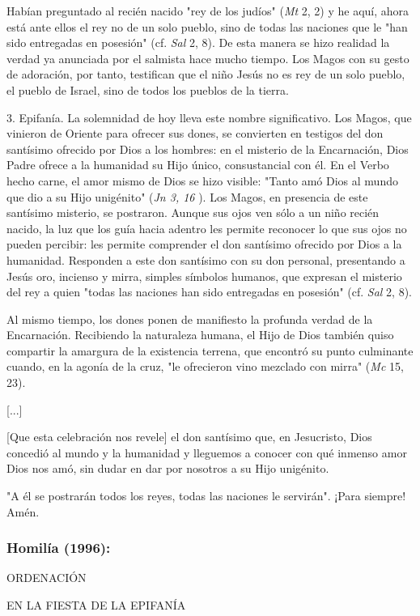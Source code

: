 \begin{body}
Habían preguntado al recién nacido "rey de los judíos" (\emph{Mt} 2, 2) y he aquí, ahora está ante ellos el rey no de un solo pueblo, sino de todas las naciones que le "han sido entregadas en posesión" (cf. \emph{Sal} 2, 8). De esta manera se hizo realidad la verdad ya anunciada por el salmista hace mucho tiempo. Los Magos con su gesto de adoración, por tanto, testifican que el niño Jesús no es rey de un solo pueblo, el pueblo de Israel, sino de todos los pueblos de la tierra.

3. Epifanía. La solemnidad de hoy lleva este nombre significativo. Los Magos, que vinieron de Oriente para ofrecer sus dones, se convierten en testigos del don santísimo ofrecido por Dios a los hombres: en el misterio de la Encarnación, Dios Padre ofrece a la humanidad su Hijo único, consustancial con él. En el Verbo hecho carne, el amor mismo de Dios se hizo visible: "Tanto amó Dios al mundo que dio a su Hijo unigénito" (\emph{Jn 3, 16} ). Los Magos, en presencia de este santísimo misterio, se postraron. Aunque sus ojos ven sólo a un niño recién nacido, la luz que los guía hacia adentro les permite reconocer lo que sus ojos no pueden percibir: les permite comprender el don santísimo ofrecido por Dios a la humanidad. Responden a este don santísimo con su don personal, presentando a Jesús oro, incienso y mirra, simples símbolos humanos, que expresan el misterio del rey a quien "todas las naciones han sido entregadas en posesión" (cf. \emph{Sal} 2, 8).

Al mismo tiempo, los dones ponen de manifiesto la profunda verdad de la Encarnación. Recibiendo la naturaleza humana, el Hijo de Dios también quiso compartir la amargura de la existencia terrena, que encontró su punto culminante cuando, en la agonía de la cruz, "le ofrecieron vino mezclado con mirra" (\emph{Mc} 15, 23).

{[}...{]}

{[}Que esta celebración nos revele{]} el don santísimo que, en Jesucristo, Dios concedió al mundo y la humanidad y lleguemos a conocer con qué inmenso amor Dios nos amó, sin dudar en dar por nosotros a su Hijo unigénito.

"A él se postrarán todos los reyes, todas las naciones le servirán". ¡Para siempre! Amén.

\subsubsection{Homilía (1996): } ORDENACIÓN

EN LA FIESTA DE LA EPIFANÍA


\end{body}
